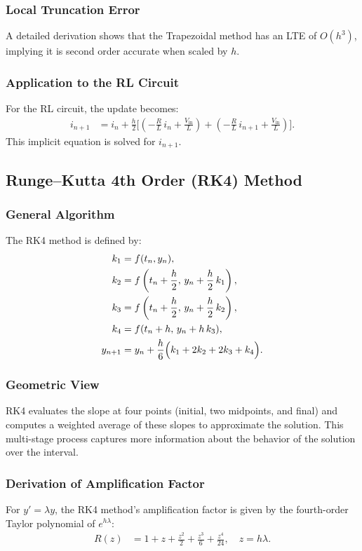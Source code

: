 \documentclass[12pt]{article}
\begin{document}
\subsubsection*{Local Truncation Error}
A detailed derivation shows that the Trapezoidal method has an LTE of $O(h^3)$, implying it is second order accurate when scaled by $h$.

\subsubsection*{Application to the RL Circuit}
For the RL circuit, the update becomes:
\begin{align}
i_{n+1} &= i_n+\frac{h}{2}\Biggl[\left(-\frac{R}{L}\, i_n+\frac{V_{\text{in}}}{L}\right) + \left(-\frac{R}{L}\, i_{n+1}+\frac{V_{\text{in}}}{L}\right)\Biggr].
\end{align}
This implicit equation is solved for $i_{n+1}$.

\subsection{Runge--Kutta 4th Order (RK4) Method}

\subsubsection*{General Algorithm}
The RK4 method is defined by:
\begin{align}
k_1 &= f(t_n,y_n), \\
k_2 &= f\left(t_n+\frac{h}{2},\, y_n+\frac{h}{2}\,k_1\right), \\
k_3 &= f\left(t_n+\frac{h}{2},\, y_n+\frac{h}{2}\,k_2\right), \\
k_4 &= f(t_n+h,\, y_n+h\,k_3), \\
y_{n+1} &= y_n+\frac{h}{6}\Bigl(k_1+2k_2+2k_3+k_4\Bigr).
\end{align}

\subsubsection*{Geometric View}
RK4 evaluates the slope at four points (initial, two midpoints, and final) and computes a weighted average of these slopes to approximate the solution. This multi-stage process captures more information about the behavior of the solution over the interval.

\subsubsection*{Derivation of Amplification Factor}
For $y'=\lambda y$, the RK4 method’s amplification factor is given by the fourth-order Taylor polynomial of $e^{h\lambda}$:
\begin{align}
R(z) &= 1+z+\frac{z^2}{2}+\frac{z^3}{6}+\frac{z^4}{24}, \quad z=h\lambda.
\end{align}
\end{document}
